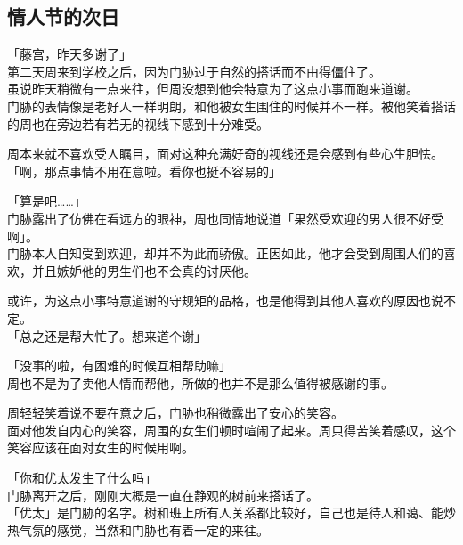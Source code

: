 \subsection{情人节的次日}

「藤宫，昨天多谢了」\\

第二天周来到学校之后，因为门胁过于自然的搭话而不由得僵住了。\\

虽说昨天稍微有一点来往，但周没想到他会特意为了这点小事而跑来道谢。\\

门胁的表情像是老好人一样明朗，和他被女生围住的时候并不一样。被他笑着搭话的周也在旁边若有若无的视线下感到十分难受。

周本来就不喜欢受人瞩目，面对这种充满好奇的视线还是会感到有些心生胆怯。\\

「啊，那点事情不用在意啦。看你也挺不容易的」

「算是吧……」\\

门胁露出了仿佛在看远方的眼神，周也同情地说道「果然受欢迎的男人很不好受啊」。\\

门胁本人自知受到欢迎，却并不为此而骄傲。正因如此，他才会受到周围人们的喜欢，并且嫉妒他的男生们也不会真的讨厌他。

或许，为这点小事特意道谢的守规矩的品格，也是他得到其他人喜欢的原因也说不定。\\

「总之还是帮大忙了。想来道个谢」

「没事的啦，有困难的时候互相帮助嘛」\\

周也不是为了卖他人情而帮他，所做的也并不是那么值得被感谢的事。

周轻轻笑着说不要在意之后，门胁也稍微露出了安心的笑容。\\

面对他发自内心的笑容，周围的女生们顿时喧闹了起来。周只得苦笑着感叹，这个笑容应该在面对女生的时候用啊。\\

\vspace{2\baselineskip}

「你和优太发生了什么吗」\\

门胁离开之后，刚刚大概是一直在静观的树前来搭话了。\\

「优太」是门胁的名字。树和班上所有人关系都比较好，自己也是待人和蔼、能炒热气氛的感觉，当然和门胁也有着一定的来往。

